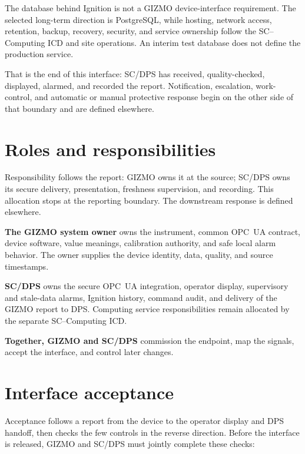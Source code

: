 \documentclass{cernatlasnote}
\begin{document}
The database behind Ignition is not a GIZMO device-interface requirement. The
selected long-term direction is PostgreSQL, while hosting, network access,
retention, backup, recovery, security, and service ownership follow the
SC--Computing ICD and site operations. An interim test database does not define
the production service.

That is the end of this interface: SC/DPS has received, quality-checked,
displayed, alarmed, and recorded the report. Notification, escalation,
work-control, and automatic or manual protective response begin on the other
side of that boundary and are defined elsewhere.

\section{Roles and responsibilities}

Responsibility follows the report: GIZMO owns it at the source; SC/DPS owns its
secure delivery, presentation, freshness supervision, and recording. This
allocation stops at the reporting boundary. The downstream response is defined
elsewhere.

\textbf{The GIZMO system owner} owns the instrument, common OPC~UA contract,
device software, value meanings, calibration authority, and safe local alarm
behavior. The owner supplies the device identity, data, quality, and source
timestamps.

\textbf{SC/DPS} owns the secure OPC~UA integration, operator display,
supervisory and stale-data alarms, Ignition history, command audit, and delivery
of the GIZMO report to DPS. Computing service responsibilities remain allocated
by the separate SC--Computing ICD.

\textbf{Together, GIZMO and SC/DPS} commission the endpoint, map the signals,
accept the interface, and control later changes.

\section{Interface acceptance}

Acceptance follows a report from the device to the operator display and DPS
handoff, then checks the few controls in the reverse direction. Before the
interface is released, GIZMO and SC/DPS must jointly complete these checks:
\end{document}
